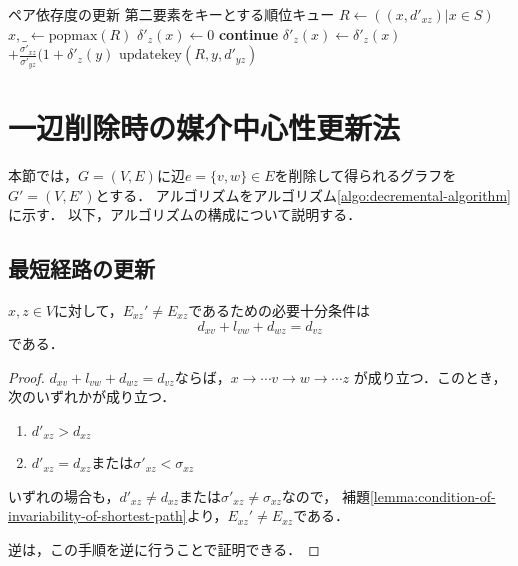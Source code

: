 \begin{algorithm}[tbp]
\begin{multicols}{2}
\begin{algorithmic}[1]
      \State \LeftComment ペア依存度の更新
      \State \LeftComment 第二要素をキーとする順位キュー
      \State $R\gets((x,d'_{xz})\vert x\in S)$
      \State $x,\_\gets\mathrm{popmax}(R)$
      \State $\delta'_z(x)\gets 0$
      \State \textbf{continue}
      \EndIf
      \State $\delta'_z(x)\gets\delta'_z(x)$
      $+\frac{\sigma'_{xz}}{\sigma'_{yz}}(1+\delta'_z(y)$
      \State $\mathrm{updatekey}(R, y, d'_{yz})$
      \EndIf
      \EndFor
      \EndWhile
      \EndProcedure
    \end{algorithmic}
  \end{multicols}
\end{algorithm}

\section{一辺削除時の媒介中心性更新法}
\label{sect:update-bc-on-delete}
本節では，$G=(V,E)$に辺$e=\{v,w\}\in E$を削除して得られるグラフを$G'=(V,E')$とする．
アルゴリズムをアルゴリズム\ref{algo:decremental-algorithm}に示す．
以下，アルゴリズムの構成について説明する．

\subsection{最短経路の更新}
\label{subsect:update-augdist-on-delete}

\begin{lemma}
  \label{lemma:update-augdist-on-delete}
  $x,z\in V$に対して，$E_{xz}'\neq E_{xz}$であるための必要十分条件は
  \[ d_{xv}+l_{vw}+d_{wz}=d_{vz} \]
  である．
\end{lemma}
\begin{proof}
  $d_{xv}+l_{vw}+d_{wz}=d_{vz}$ならば，$x\rightarrow\cdots v\rightarrow w\rightarrow\cdots z$
  が成り立つ．このとき，次のいずれかが成り立つ．
  \begin{enumerate}
  \item $d'_{xz}>d_{xz}$
  \item $d'_{xz}=d_{xz}$または$\sigma'_{xz}<\sigma_{xz}$
  \end{enumerate}
  いずれの場合も，$d'_{xz}\neq d_{xz}$または$\sigma'_{xz}\neq\sigma_{xz}$なので，
  補題\ref{lemma:condition-of-invariability-of-shortest-path}より，$E_{xz}'\neq E_{xz}$である．

  逆は，この手順を逆に行うことで証明できる．
\end{proof}

